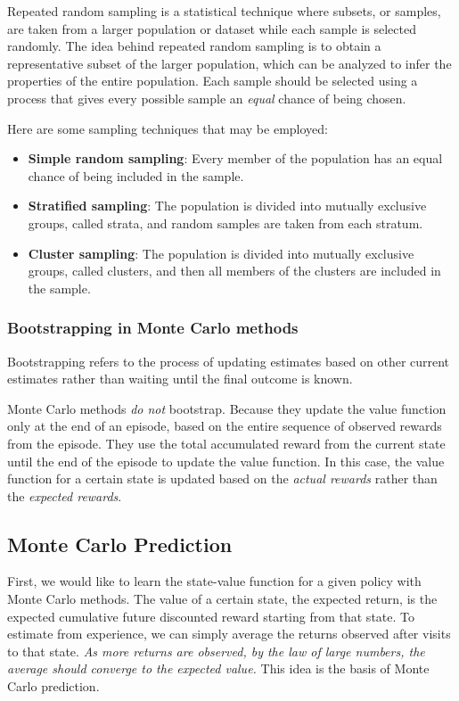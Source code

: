 \documentclass{article}
\begin{document}
Repeated random sampling is a statistical technique where subsets, or samples, are taken from a larger population or dataset while each sample is selected randomly. The idea behind repeated random sampling is to obtain a representative subset of the larger population, which can be analyzed to infer the properties of the entire population. Each sample should be selected using a process that gives every possible sample an \emph{equal} chance of being chosen.

Here are some sampling techniques that may be employed:

\begin{itemize}
    \item \textbf{Simple random sampling}: Every member of the population has an equal chance of being included in the sample.
    \item \textbf{Stratified sampling}: The population is divided into mutually exclusive groups, called strata, and random samples are taken from each stratum.
    \item \textbf{Cluster sampling}: The population is divided into mutually exclusive groups, called clusters, and then all members of the clusters are included in the sample.
\end{itemize}

\subsubsection{Bootstrapping in Monte Carlo methods}\label{sec:bootstrapping}

Bootstrapping refers to the process of updating estimates based on other current estimates rather than waiting until the final outcome is known.

Monte Carlo methods \emph{do not} bootstrap. Because they update the value function only at the end of an episode, based on the entire sequence of observed rewards from the episode. They use the total accumulated reward from the current state until the end of the episode to update the value function. In this case, the value function for a certain state is updated based on the \emph{actual rewards} rather than the \emph{expected rewards}.

\subsection{Monte Carlo Prediction}

First, we would like to learn the state-value function for a given policy with Monte Carlo methods. The value of a certain state, the expected return, is the expected cumulative future discounted reward starting from that state. To estimate from experience, we can simply average the returns observed after visits to that state. \emph{As more returns are observed, by the law of large numbers, the average should converge to the expected value.} This idea is the basis of Monte Carlo prediction.
\end{document}
